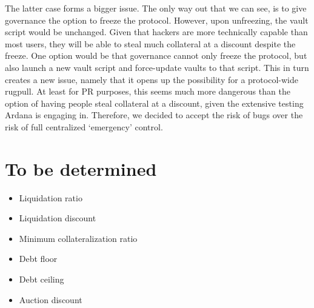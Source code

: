 \documentclass{article} %
\begin{document}
The latter case forms a bigger issue.
The only way out that we can see, is to give governance the option to freeze the
protocol.
However, upon unfreezing, the vault script would be unchanged.
Given that hackers are more technically capable than most users, they will be
able to steal much collateral at a discount despite the freeze.
One option would be that governance cannot only freeze the protocol, but also
launch a new vault script and force-update vaults to that script.
This in turn creates a new issue, namely that it opens up the possibility for a
protocol-wide rugpull.
At least for PR purposes, this seems much more dangerous than the option of
having people steal collateral at a discount, given the extensive testing Ardana
is engaging in.
Therefore, we decided to accept the risk of bugs over the risk of full
centralized `emergency' control.

\section{To be determined}

\begin{itemize}
  \item Liquidation ratio
  \item Liquidation discount
  \item Minimum collateralization ratio
  \item Debt floor
  \item Debt ceiling
  \item Auction discount
\end{itemize}
\end{document}
